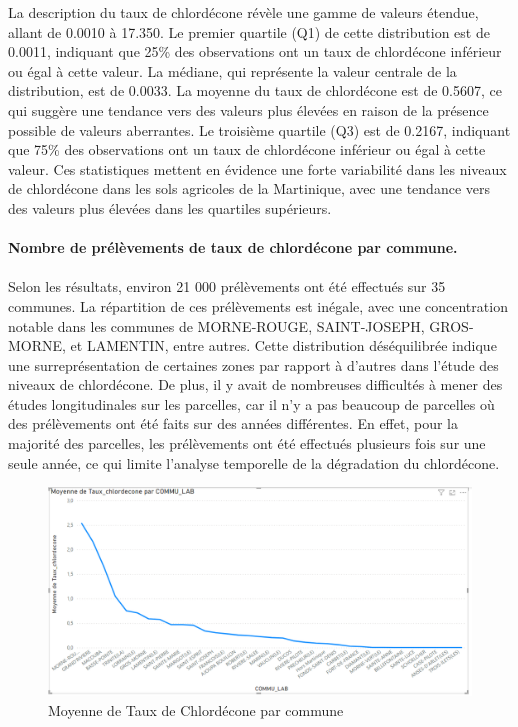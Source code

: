 \documentclass{report}
\begin{document}
La description du taux de chlordécone révèle une gamme de valeurs étendue, allant de 0.0010 à 17.350. Le premier quartile (Q1) de cette distribution est de 0.0011, indiquant que 25\% des observations ont un taux de chlordécone inférieur ou égal à cette valeur. La médiane, qui représente la valeur centrale de la distribution, est de 0.0033. La moyenne du taux de chlordécone est de 0.5607, ce qui suggère une tendance vers des valeurs plus élevées en raison de la présence possible de valeurs aberrantes. Le troisième quartile (Q3) est de 0.2167, indiquant que 75\% des observations ont un taux de chlordécone inférieur ou égal à cette valeur. Ces statistiques mettent en évidence une forte variabilité dans les niveaux de chlordécone dans les sols agricoles de la Martinique, avec une tendance vers des valeurs plus élevées dans les quartiles supérieurs.\\\\

\textbf{Nombre de prélèvements de taux de chlordécone par commune.}\\\\
Selon les résultats, environ 21 000 prélèvements ont été effectués sur 35 communes. La répartition de ces prélèvements est inégale, avec une concentration notable dans les communes de MORNE-ROUGE, SAINT-JOSEPH, GROS-MORNE, et LAMENTIN, entre autres. Cette distribution déséquilibrée indique une surreprésentation de certaines zones par rapport à d'autres dans l'étude des niveaux de chlordécone. De plus, il y avait de nombreuses difficultés à mener des études longitudinales sur les parcelles, car il n'y a pas beaucoup de parcelles où des prélèvements ont été faits sur des années différentes. En effet, pour la majorité des parcelles, les prélèvements ont été effectués plusieurs fois sur une seule année, ce qui limite l'analyse temporelle de la dégradation du chlordécone.

\begin{figure}[!h]
\centering
\includegraphics[width = 1
\linewidth]{moyenne_taux_chlordecone_par_commune.png}
\caption{Moyenne de Taux de Chlordécone par commune}
\end{figure}
\end{document}
